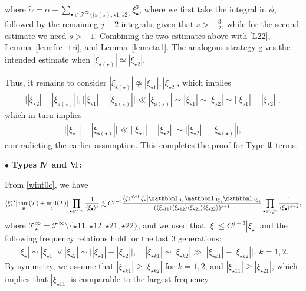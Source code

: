 \documentclass[%
11pt,  reqno]{amsart}
\newcommand{\II}{\textup{I \hspace{-2.9mm} I} }
\newcommand{\IV}{\textup{I \hspace{-2.9mm} V}}
\newcommand{\5}{\textup{V}}
\newcommand{\VI}{\text{V\hspace{-1.6mm} I}}
\newcommand{\noi}{\noindent}
\newcommand{\ind}{\mathbbm 1}
\newcommand{\les}{\lesssim}
\newcommand{\wt}{\widetilde}
\theoremstyle{remark}
\newcommand{\bul}{\bullet}
\newcommand{\TT}{\mathcal{T}}
\newcommand{\al}{\alpha}
\newcommand{\bfrak}{\mathfrak{b}}
\newcommand{\gfrak}{\mathfrak{g}}
\newcommand{\sbf}{\mathbf{s}}
\newcommand{\jb}[1]
{\langle #1 \rangle}
\DeclareMathOperator{\mul}{mul}
\numberwithin{equation}{section}
\numberwithin{theorem}{section}
\begin{document}
where $\wt\al = \al + \sum_{\bul\in \TT^\infty\setminus\{\sbf(\star), \star1, \star2\}} \xi_\bul^3$, where we first take the integral in $\phi$, followed by the remaining $j-2$ integrals, given that $s>-\frac32$, while for the second estimate we need $s>-1$. 
Combining the two estimates above with \eqref{L22}, Lemma~\ref{lem:fre_tri}, and Lemma~\ref{lem:eta1}. 
The analogous strategy gives the intended estimate when $|\xi_{\sbf(\star)}| \simeq |\xi_{\star2}|$. 

Thus, it remains to consider $|\xi_{\sbf(\star)}| \not\simeq |\xi_{\star1}|, |\xi_{\star2}|$, which implies
\begin{align}
\big| |\xi_{\star2}| - |\xi_{\sbf(\star)}| \big| 
, \big| |\xi_{\star1}| - |\xi_{\sbf(\star)}| \big| 
\ll 
|\xi_{\sbf(\star)}| 
\sim |\xi_{\star1}| \sim |\xi_{\star2}|
\sim \big| |\xi_{\star1}| - |\xi_{\star2}| \big|, 
\end{align}
which in turn implies 
\begin{align}
\big| | \xi_{\star1}| - |\xi_{\sbf(\star)}| \big|
\ll \big| | \xi_{\star1}| - |\xi_{\star2}| \big|
\sim 
\big| |\xi_{\star2}| - | \xi_{\sbf(\star)}| \big| , 
\end{align}
contradicting the earlier assumption. This completes the proof for Type $\II$ terms. 


\medskip 


\noi
$\bul$ \textbf{Types $\IV$ and $\VI$:}

From \eqref{wint0c}, we have
\begin{align}\label{L24}
\jb{\xi}^s | \mul_\gfrak(\TT) + \mul_\bfrak(\TT) | 
\prod_{\bul \in \TT^\infty} \frac{1}{\jb{\xi_\bul}^s}
\les 
C^{j-3}
\frac{\jb{\xi}^{s\lor 0} |\xi_\star| \ind_{A_\star} \ind_{A^c_{\star1}} \ind_{A^c_{\star2}} }{ 
(\jb{\xi_{\star11}} \jb{\xi_{\star12}} \jb{\xi_{\star21}} \jb{\xi_{\star22}})^{s+1} } \prod_{\bul\in \TT^\infty_\star} \frac{1}{\jb{\xi_\bul}^{s+2}}, 
\end{align}
where $\TT^\infty_\star = \TT^\infty \setminus\{ \star11, \star12, \star21, \star22\}$, and we used that $|\xi| \le C^{j-3} |\xi_\star|$ and the following frequency relations hold for the last 3 generations:
\begin{align}\label{L24freq}
| \xi_\star| \sim |\xi_{\star1}| \lor |\xi_{\star2}| \sim \big| |\xi_{\star1}| - |\xi_{\star2}| \big| , 
\quad 
|\xi_{\star k 1 } | \sim |\xi_{\star k2 } | \gg \big| |\xi_{\star k 1} | - |\xi_{\star k 2 }| \big|, \ k=1,2. 
\end{align}
By symmetry, we assume that $|\xi_{\star k1 }| \ge |\xi_{\star k 2} | $ for $k=1,2$, and $|\xi_{\star11}| \ge |\xi_{\star21}|$, which implies that $|\xi_{\star11}|$ is comparable to the largest frequency. 
\end{document}
